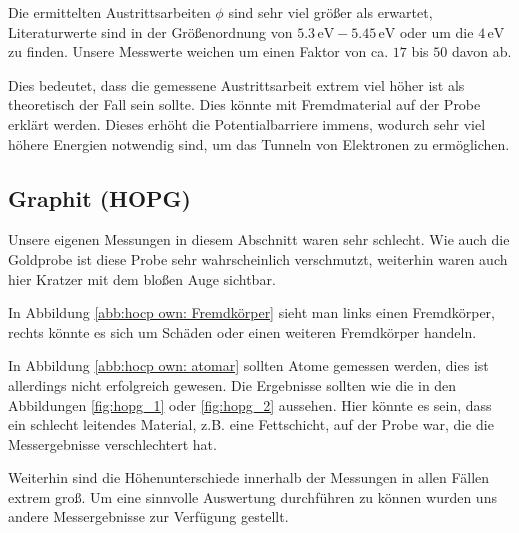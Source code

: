 \documentclass[12pt,a4paper]{scrartcl}
\numberwithin{equation}{section} %
\begin{document}
\noindent
Die ermittelten Austrittsarbeiten $\phi$ sind sehr viel größer als erwartet, Literaturwerte sind in der Größenordnung von $5.3\mathrm{\,eV} - 5.45\mathrm{\,eV}$ \cite{Sachtler} oder um die $4\mathrm{\,eV}$ \cite{Anleitung} zu finden. Unsere Messwerte weichen um einen Faktor von ca. $17$ bis $50$ davon ab.

Dies bedeutet, dass die gemessene Austrittsarbeit extrem viel höher ist als theoretisch der Fall sein sollte. Dies könnte mit Fremdmaterial auf der Probe erklärt werden. Dieses erhöht die Potentialbarriere immens, wodurch sehr viel höhere Energien notwendig sind, um das Tunneln von Elektronen zu ermöglichen.

\hypertarget{graphit-hopg}{%
\subsection{Graphit (HOPG)}\label{graphit-hopg}}
Unsere eigenen Messungen in diesem Abschnitt waren sehr schlecht. Wie auch die Goldprobe ist diese Probe sehr wahrscheinlich verschmutzt, weiterhin waren auch hier Kratzer mit dem bloßen Auge sichtbar.

In Abbildung \ref{abb:hocp own: Fremdkörper} sieht man links einen Fremdkörper, rechts könnte es sich um Schäden oder einen weiteren Fremdkörper handeln.

In Abbildung \ref{abb:hocp own: atomar} sollten Atome gemessen werden, dies ist allerdings nicht erfolgreich gewesen. Die Ergebnisse sollten wie die in den Abbildungen \ref{fig:hopg_1} oder \ref{fig:hopg_2} aussehen. Hier könnte es sein, dass ein schlecht leitendes Material, z.B. eine Fettschicht, auf der Probe war, die die Messergebnisse verschlechtert hat.

Weiterhin sind die Höhenunterschiede innerhalb der Messungen in allen Fällen extrem groß. Um eine sinnvolle Auswertung durchführen zu können wurden uns andere Messergebnisse zur Verfügung gestellt. \cite{Grover}
\end{document}
